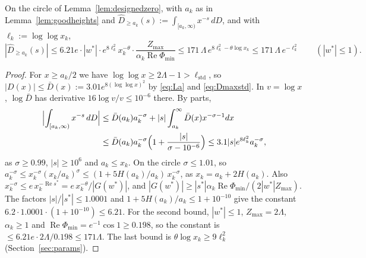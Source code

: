 \begin{lemma}\label{lem:latenoise}
On the circle of Lemma~\ref{lem:designedzero}, with $a_k$ as in Lemma~\ref{lem:goodheights} and
$\widehat D_{\ge a_k}(s):=\int_{[a_k,\infty)}x^{-s}\,dD$, and with $\ell_k:=\log\log x_k$,
\[
  |\widehat D_{\ge a_k}(s)|\le6.21e\cdot|w^*|\cdot e^{8\ell_k^2}x_k^{-\theta}\cdot\frac{Z_{\max}}{\alpha_k\operatorname{Re}\Phi_{\min}}
  \le171\,\Lambda\,e^{8\ell_k^2-\theta\log x_k}\le171\,\Lambda\,e^{-\ell_k^2}\qquad(|w^*|\le1).
\]
\end{lemma}
\begin{proof}
For $x\ge a_k/2$ we have $\log\log x\ge2\Lambda-1>\ell_{\mathrm{std}}$, so $|D(x)|\le\bar D(x):=3.01e^{8(\log\log x)^2}$ by
\eqref{eq:La} and \eqref{eq:Dmaxstd}. In $v=\log x$, $\log\bar D$ has derivative $16\log v/v\le10^{-6}$ there. By parts,
\[
\begin{aligned}
  \Bigl|\int_{[a_k,\infty)}x^{-s}\,dD\Bigr|&\le\bar D(a_k)a_k^{-\sigma}+|s|\int_{a_k}^\infty\bar D(x)x^{-\sigma-1}dx\\
  &\le\bar D(a_k)a_k^{-\sigma}\Bigl(1+\frac{|s|}{\sigma-10^{-6}}\Bigr)\le3.1|s|e^{8\ell_k^2}a_k^{-\sigma},
\end{aligned}
\]
as $\sigma\ge0.99$, $|s|\ge10^6$ and $a_k\le x_k$. On the circle $\sigma\le1.01$, so
$a_k^{-\sigma}\le x_k^{-\sigma}(x_k/a_k)^{\sigma}\le(1+5H(a_k)/a_k)\,x_k^{-\sigma}$, as $x_k=a_k+2H(a_k)$. Also
$x_k^{-\sigma}\le e\,x_k^{-\operatorname{Re}s^*}=e\,x_k^{-\theta}/|G(w^*)|$, and $|G(w^*)|\ge|s^*|\alpha_k\operatorname{Re}\Phi_{\min}/(2|w^*|Z_{\max})$.
The factors $|s|/|s^*|\le1.0001$ and $1+5H(a_k)/a_k\le1+10^{-10}$ give the constant $6.2\cdot1.0001\cdot(1+10^{-10})\le6.21$. For the
second bound, $|w^*|\le1$, $Z_{\max}=2\Lambda$, $\alpha_k\ge1$ and $\operatorname{Re}\Phi_{\min}=e^{-1}\cos1\ge0.198$, so the
constant is $\le6.21e\cdot2\Lambda/0.198\le171\Lambda$. The last bound is $\theta\log x_k\ge9\ell_k^2$ (Section~\ref{sec:params}).
\end{proof}

